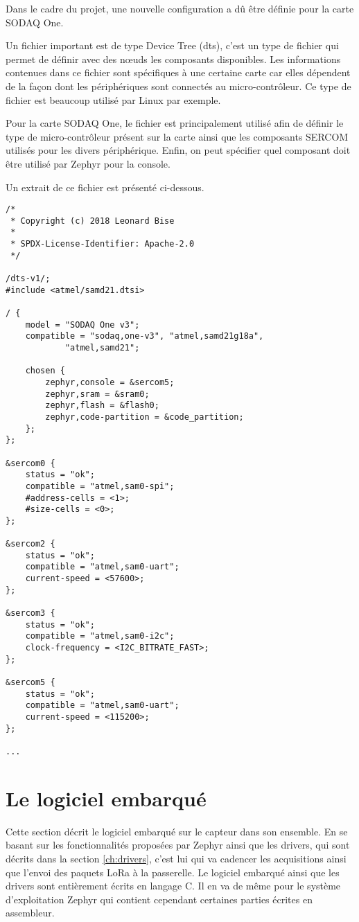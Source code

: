 Dans le cadre du projet, une nouvelle configuration a dû être définie pour la carte SODAQ One.

Un fichier important est de type Device Tree (dts), c'est un type de fichier qui permet de définir avec des nœuds les composants disponibles. Les informations contenues dans ce fichier sont spécifiques à une certaine carte car elles dépendent de la façon dont les périphériques sont connectés au micro-contrôleur. Ce type de fichier est beaucoup utilisé par Linux par exemple.

Pour la carte SODAQ One, le fichier est principalement utilisé afin de définir le type de micro-contrôleur présent sur la carte ainsi que les composants SERCOM utilisés pour les divers périphérique. Enfin, on peut spécifier quel composant doit être utilisé par Zephyr pour la console.

Un extrait de ce fichier est présenté ci-dessous.

\begin{lstlisting}
/*
 * Copyright (c) 2018 Leonard Bise
 *
 * SPDX-License-Identifier: Apache-2.0
 */

/dts-v1/;
#include <atmel/samd21.dtsi>

/ {
	model = "SODAQ One v3";
	compatible = "sodaq,one-v3", "atmel,samd21g18a",
			"atmel,samd21";

	chosen {
		zephyr,console = &sercom5;
		zephyr,sram = &sram0;
		zephyr,flash = &flash0;
		zephyr,code-partition = &code_partition;
	};
};

&sercom0 {
	status = "ok";
	compatible = "atmel,sam0-spi";
	#address-cells = <1>;
	#size-cells = <0>;
};

&sercom2 {
	status = "ok";
	compatible = "atmel,sam0-uart";
	current-speed = <57600>;
};

&sercom3 {
	status = "ok";
	compatible = "atmel,sam0-i2c";
	clock-frequency = <I2C_BITRATE_FAST>;	
};

&sercom5 {
	status = "ok";
	compatible = "atmel,sam0-uart";
	current-speed = <115200>;
};

...

\end{lstlisting}

\section{Le logiciel embarqué}

Cette section décrit le logiciel embarqué sur le capteur dans son ensemble. En se basant sur les fonctionnalités proposées par Zephyr ainsi que les drivers, qui sont décrits dans la section \ref{ch:drivers}, c'est lui qui va cadencer les acquisitions ainsi que l'envoi des paquets LoRa à la passerelle. Le logiciel embarqué ainsi que les drivers sont entièrement écrits en langage C. Il en va de même pour le système d'exploitation Zephyr qui contient cependant certaines parties écrites en assembleur.

